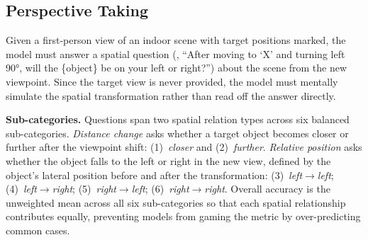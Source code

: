 \subsection{Perspective Taking}
\label{sec:perspective_taking}

Given a first-person view of an indoor scene with target positions marked, the model must answer a spatial question (\eg, ``After moving to `X' and turning left 90°, will the \{object\} be on your left or right?'') about the scene from the new viewpoint. Since the target view is never provided, the model must mentally simulate the spatial transformation rather than read off the answer directly.

\noindent\textbf{Sub-categories.}
Questions span two spatial relation types across six balanced sub-categories.
\emph{Distance change} asks whether a target object becomes closer or further after the viewpoint shift: (1)~\emph{closer} and (2)~\emph{further}.
\emph{Relative position} asks whether the object falls to the left or right in the new view, defined by the object's lateral position before and after the transformation: (3)~\emph{left$\to$left}; (4)~\emph{left$\to$right}; (5)~\emph{right$\to$left}; (6)~\emph{right$\to$right}.
Overall accuracy is the unweighted mean across all six sub-categories so that each spatial relationship contributes equally, preventing models from gaming the metric by over-predicting common cases.


